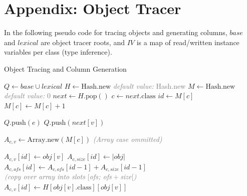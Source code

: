 \documentclass[preprint]{sigplanconf}
\begin{document}

\appendix
\section{Appendix: Object Tracer}
In the following pseudo code for tracing objects and generating columns, $\mathit{base}$ and $\mathit{lexical}$ are object tracer roots, and $\mathit{IV}$ is a map of read/written instance variables per class (type inference).

\label{sec:appendix_obj_tracer}
\begin{algorithm}
\caption{Object Tracing and Column Generation}
\label{CHalgorithm}
\begin{algorithmic}[1]
\State $\mathit{Q} \gets \mathit{base} \cup \mathit{lexical}$
\State $H \gets \mbox{Hash.new}$ \hfill \textcolor{gray}{\textit{default value:} Hash.new}
\State $M \gets \mbox{Hash.new}$ \hfill \textcolor{gray}{\textit{default value:} 0}
    \State $\mathit{next} \gets H.\mbox{pop}()$
    \State $c \gets \mathit{next}.\mbox{class}$
        \State $\mathit{id} \gets M[c]$
        \State $M[c] \gets M[c] + 1$

                \State $Q.\mbox{push}(e)$
            \EndFor
        \Else
                \State $Q.\mbox{push}(\mathit{next}[v])$
            \EndFor
        \EndIf
    \EndIf
\EndWhile

        \State $A_{c,v} \gets \mbox{Array.new}(M[c])$ \hfill \textcolor{gray}{\textit{(Array case ommitted)}}
    \EndFor

                \State $A_{c,v}[\mathit{id}] \gets \mathit{obj}[v]$
                \State $A_{c, \mathit{size}}[\mathit{id}] \gets |\mathit{obj}|$
                \State $A_{c, \mathit{ofs}}[\mathit{id}] \gets A_{c, \mathit{ofs}}[\mathit{id} - 1] + A_{c, \mathit{size}}[\mathit{id} - 1]$
                \State $\mbox{\textcolor{gray}{\textit{(copy over array into slots $[\mathit{ofs}$; $\mathit{ofs} + \mathit{size}[$)}}}$
            \Else
                \State $A_{c,v}[\mathit{id}] \gets H[\mathit{obj}[v].\mbox{class}][\mathit{obj}[v]]$
            \EndIf
        \EndFor
    \EndFor
\EndFor
\EndProcedure
\end{algorithmic}
\end{algorithm}



\end{document}
